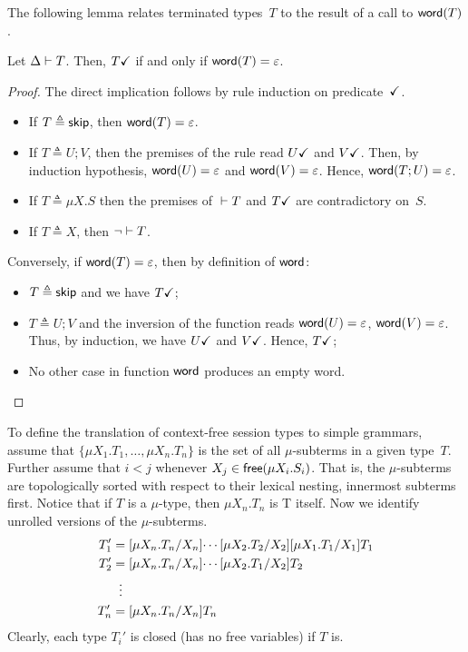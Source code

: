 The following lemma relates terminated types~$T$ to the result 
of a call to $\word(T)$. 

\begin{lemma}
  \label{lemma:terminated-togrammar}
  Let $\isType T$. Then, $\DONE T$ if and only if
  $\word(T) = \varepsilon$.
\end{lemma}
%
\begin{proof}
  The direct implication follows by rule induction on
  predicate~$\DONE$.
  \begin{itemize}
  \item If $T \triangleq \skipk$, then $\word(T) = \varepsilon$.
  \item If $T\triangleq U;V$, then the premises of the rule read
    $\DONE{U}$ and $\DONE{V}$. Then, by induction hypothesis,
    $\word(U) = \varepsilon$ and $\word(V) = \varepsilon$. Hence,
    $\word(T;U) = \varepsilon$.
  \item If $T\triangleq \mu X.S$ then the premises of $\isType[]T$ and
    $\DONE T$ are contradictory on~$S$.
  \item If $T\triangleq X$, then $\neg \isType[]T$.
  \end{itemize}
  Conversely, if $\word(T) = \varepsilon$, then by definition of
  $\word$:
  \begin{itemize}
  \item $T\triangleq \skipk$ and we have $\DONE T$;
  \item $T\triangleq U;V$ and the inversion of the function reads
    $\word(U) = \varepsilon$, $\word(V) = \varepsilon$.  Thus, by
    induction, we have $\DONE U$ and $\DONE V$. Hence, $\DONE T$;
  \item No other case in function $\word$ produces an empty word.
  \end{itemize}
\end{proof}



To define the translation of context-free session types to simple
grammars, assume that $\{\mu X_1.T_1,\dots,\mu X_n.T_n\}$ is the set
of all $\mu$-subterms in a given type~$T$. Further assume that $i<j$
whenever $X_j \in \free(\mu X_i.S_i)$. That is, the $\mu$-subterms are
topologically sorted with respect to their lexical nesting, innermost
subterms first.
%
Notice that if $T$ is a $\mu$-type, then $\mu X_n. T_n$ is T itself.
Now we identify unrolled versions of the $\mu$-subterms.
%
\begin{align*}
  T_1' &= \subs{\mu X_n.T_n}{X_n}{ \cdots \subs{\mu X_2.T_2}{X_2}\subs{\mu X_1.T_1}{X_1}{T_1} }\\
  T_2' &= \subs{\mu X_n.T_n}{X_n}{ \cdots \subs{\mu X_2.T_1}{X_2}{T_2} }\\
       &\;\;\vdots \\
  T_n' &= \subs{\mu X_n.T_n}{X_n}{T_n} 
\end{align*}
%
Clearly, each type $T_i'$ is closed (has no free variables) if $T$ is.

